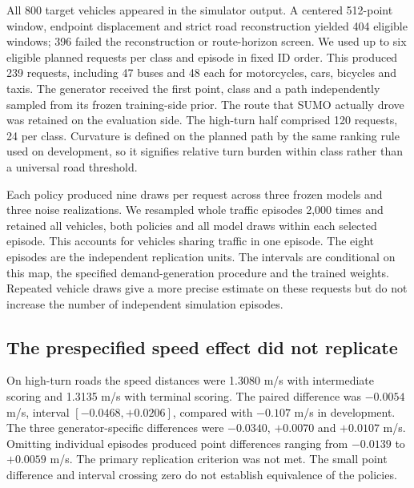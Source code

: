 All 800 target vehicles appeared in the simulator output. A centered 512-point window, endpoint displacement and strict road reconstruction yielded 404 eligible windows; 396 failed the reconstruction or route-horizon screen. We used up to six eligible planned requests per class and episode in fixed ID order. This produced 239 requests, including 47 buses and 48 each for motorcycles, cars, bicycles and taxis. The generator received the first point, class and a path independently sampled from its frozen training-side prior. The route that SUMO actually drove was retained on the evaluation side. The high-turn half comprised 120 requests, 24 per class. Curvature is defined on the planned path by the same ranking rule used on development, so it signifies relative turn burden within class rather than a universal road threshold.

Each policy produced nine draws per request across three frozen models and three noise realizations. We resampled whole traffic episodes 2,000 times and retained all vehicles, both policies and all model draws within each selected episode. This accounts for vehicles sharing traffic in one episode. The eight episodes are the independent replication units. The intervals are conditional on this map, the specified demand-generation procedure and the trained weights. Repeated vehicle draws give a more precise estimate on these requests but do not increase the number of independent simulation episodes.

\subsection{The prespecified speed effect did not replicate}
On high-turn roads the speed distances were 1.3080 m/s with intermediate scoring and 1.3135 m/s with terminal scoring. The paired difference was $-0.0054$ m/s, interval $[-0.0468,+0.0206]$, compared with $-0.107$ m/s in development. The three generator-specific differences were $-0.0340$, $+0.0070$ and $+0.0107$ m/s. Omitting individual episodes produced point differences ranging from $-0.0139$ to $+0.0059$ m/s. The primary replication criterion was not met. The small point difference and interval crossing zero do not establish equivalence of the policies.


